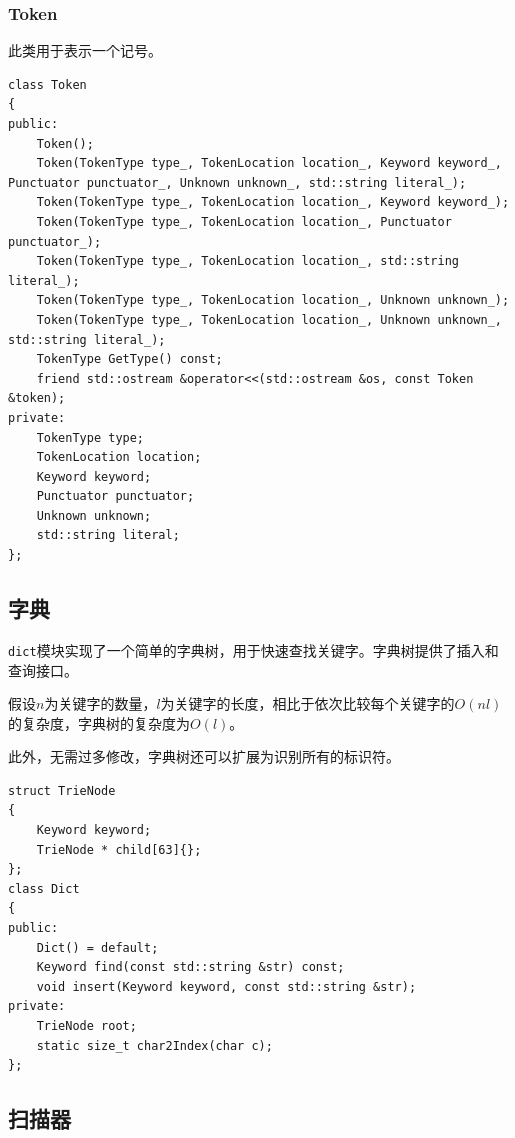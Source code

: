 \documentclass[lang=cn,11pt,a4paper,cite=authornum]{paper}
\begin{document}
\subsubsection{Token}

此类用于表示一个记号。

\begin{code}
    \begin{verbatim}
class Token
{
public:
    Token();
    Token(TokenType type_, TokenLocation location_, Keyword keyword_, Punctuator punctuator_, Unknown unknown_, std::string literal_);
    Token(TokenType type_, TokenLocation location_, Keyword keyword_);
    Token(TokenType type_, TokenLocation location_, Punctuator punctuator_);
    Token(TokenType type_, TokenLocation location_, std::string literal_);
    Token(TokenType type_, TokenLocation location_, Unknown unknown_);
    Token(TokenType type_, TokenLocation location_, Unknown unknown_, std::string literal_);
    TokenType GetType() const;
    friend std::ostream &operator<<(std::ostream &os, const Token &token);
private:
    TokenType type;
    TokenLocation location;
    Keyword keyword;
    Punctuator punctuator;
    Unknown unknown;
    std::string literal;
};
\end{verbatim}
\end{code}

\subsection{字典}

\texttt{dict}模块实现了一个简单的字典树，用于快速查找关键字。字典树提供了插入和查询接口。

假设$n$为关键字的数量，$l$为关键字的长度，相比于依次比较每个关键字的$O(nl)$的复杂度，字典树的复杂度为$O(l)$。

此外，无需过多修改，字典树还可以扩展为识别所有的标识符。

\begin{code}
\begin{verbatim}
struct TrieNode
{
    Keyword keyword;
    TrieNode * child[63]{};
};
class Dict
{
public:
    Dict() = default;
    Keyword find(const std::string &str) const;
    void insert(Keyword keyword, const std::string &str);
private:
    TrieNode root;
    static size_t char2Index(char c);
};
\end{verbatim}
\end{code}

\subsection{扫描器}
\end{document}
